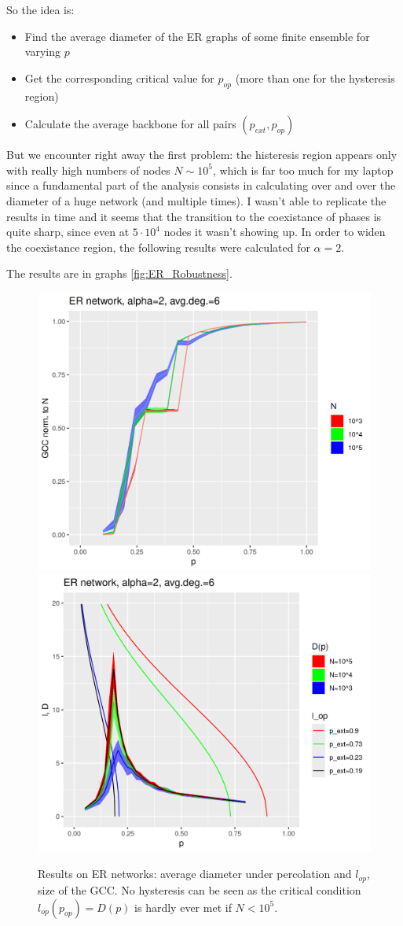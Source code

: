So the idea is:
\begin{itemize}
    \item Find the average diameter of the ER graphs of some finite ensemble for varying $p$
    \item Get the corresponding critical value for $p_{op}$ (more than one for the hysteresis region)
    \item Calculate the average backbone for all pairs $(p_{ext}, p_{op})$
\end{itemize}
But we encounter right away the first problem: the histeresis region appears only with really high numbers of nodes $N \sim 10^5$, which is far too much for my laptop since a fundamental part of the analysis consists in calculating over and over the diameter of a huge network (and multiple times). I wasn't able to replicate the results in time and it seems that the transition to the coexistance of phases is quite sharp, since even at $5\cdot 10^4$ nodes it wasn't showing up.
In order to widen the coexistance region, the following results were calculated for $\alpha=2$.

The results are in graphs \autoref{fig:ER_Robustness}.
\begin{figure}
    \centering
    \includegraphics[width=0.7\linewidth]{images/ER_GCC.png}
    \includegraphics[width=0.7\linewidth]{images/ER_Rob.png}
    \caption{Results on ER networks: average diameter under percolation and $l_{op}$, size of the GCC. No hysteresis can be seen as the critical condition $l_{op}(p_{op})=D(p)$ is hardly ever met if $N<10^5$.}
    \label{fig:ER_Robustness}
\end{figure}
\newpage